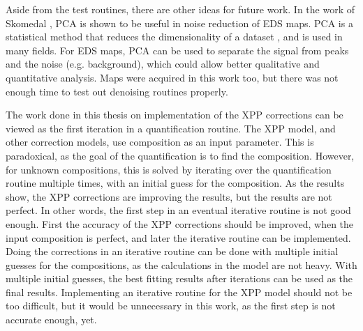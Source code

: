 Aside from the test routines, there are other ideas for future work.
In the work of Skomedal \cite{skomedal_improving_2022}, PCA is shown to be useful in noise reduction of EDS maps.
PCA is a statistical method that reduces the dimensionality of a dataset \cite{pca_textbook}, and is used in many fields.
For EDS maps, PCA can be used to separate the signal from peaks and the noise (e.g. background), which could allow better qualitative and quantitative analysis.
Maps were acquired in this work too, but there was not enough time to test out denoising routines properly.


The work done in this thesis on implementation of the XPP corrections can be viewed as the first iteration in a quantification routine.
The XPP model, and other correction models, use composition as an input parameter.
This is paradoxical, as the goal of the quantification is to find the composition.
However, for unknown compositions, this is solved by iterating over the quantification routine multiple times, with an initial guess for the composition.
As the results show, the XPP corrections are improving the results, but the results are not perfect.
In other words, the first step in an eventual iterative routine is not good enough.
First the accuracy of the XPP corrections should be improved, when the input composition is perfect, and later the iterative routine can be implemented.
Doing the corrections in an iterative routine can be done with multiple initial guesses for the compositions, as the calculations in the model are not heavy.
With multiple initial guesses, the best fitting results after iterations can be used as the final results.
Implementing an iterative routine for the XPP model should not be too difficult, but it would be unnecessary in this work, as the first step is not accurate enough, yet.
